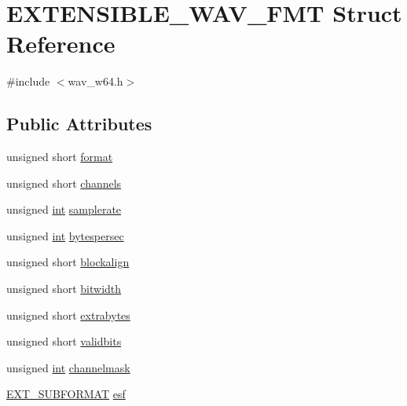 \hypertarget{struct_e_x_t_e_n_s_i_b_l_e___w_a_v___f_m_t}{}\section{E\+X\+T\+E\+N\+S\+I\+B\+L\+E\+\_\+\+W\+A\+V\+\_\+\+F\+MT Struct Reference}
\label{struct_e_x_t_e_n_s_i_b_l_e___w_a_v___f_m_t}


{\ttfamily \#include $<$wav\+\_\+w64.\+h$>$}

\subsection*{Public Attributes}
\begin{DoxyCompactItemize}
\item 
unsigned short \hyperlink{struct_e_x_t_e_n_s_i_b_l_e___w_a_v___f_m_t_a65f0b3c4dab54223863017a8ffe67580}{format}
\item 
unsigned short \hyperlink{struct_e_x_t_e_n_s_i_b_l_e___w_a_v___f_m_t_a4825c5cd25936d010d930c0e57b5b012}{channels}
\item 
unsigned \hyperlink{xmltok_8h_a5a0d4a5641ce434f1d23533f2b2e6653}{int} \hyperlink{struct_e_x_t_e_n_s_i_b_l_e___w_a_v___f_m_t_a66c0d79a22c39f7ff8331402554b1eba}{samplerate}
\item 
unsigned \hyperlink{xmltok_8h_a5a0d4a5641ce434f1d23533f2b2e6653}{int} \hyperlink{struct_e_x_t_e_n_s_i_b_l_e___w_a_v___f_m_t_af3fc5c0f505bb161fe4a9bd06b7010cd}{bytespersec}
\item 
unsigned short \hyperlink{struct_e_x_t_e_n_s_i_b_l_e___w_a_v___f_m_t_a89632ac2a30abf6bfc7ea054916665cc}{blockalign}
\item 
unsigned short \hyperlink{struct_e_x_t_e_n_s_i_b_l_e___w_a_v___f_m_t_a7c00d175c4a5c05fead4d02d243770e3}{bitwidth}
\item 
unsigned short \hyperlink{struct_e_x_t_e_n_s_i_b_l_e___w_a_v___f_m_t_a3420bd53a89e28dbe0185e1e6315afb3}{extrabytes}
\item 
unsigned short \hyperlink{struct_e_x_t_e_n_s_i_b_l_e___w_a_v___f_m_t_a43ef1f89bcc07fad28ee76c61e49b795}{validbits}
\item 
unsigned \hyperlink{xmltok_8h_a5a0d4a5641ce434f1d23533f2b2e6653}{int} \hyperlink{struct_e_x_t_e_n_s_i_b_l_e___w_a_v___f_m_t_adcbcad5e3daa47055e3103268bdf0926}{channelmask}
\item 
\hyperlink{struct_e_x_t___s_u_b_f_o_r_m_a_t}{E\+X\+T\+\_\+\+S\+U\+B\+F\+O\+R\+M\+AT} \hyperlink{struct_e_x_t_e_n_s_i_b_l_e___w_a_v___f_m_t_acf10745bc44f2983709b647f96631cc9}{esf}
\end{DoxyCompactItemize}


